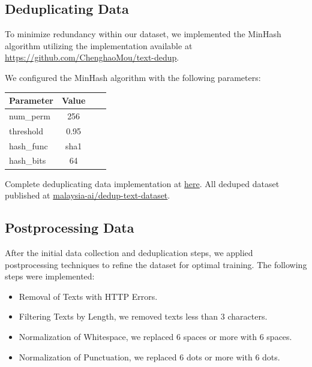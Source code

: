 \documentclass[preprint]{article}
\begin{document}
\subsection{Deduplicating Data}

To minimize redundancy within our dataset, we implemented the MinHash algorithm utilizing the implementation available at \url{https://github.com/ChenghaoMou/text-dedup}.

We configured the MinHash algorithm with the following parameters:

\begin{table}[h]
  \centering
  \begin{tabular}{lccl}
    \hline
    \textbf{Parameter} & \textbf{Value} \\
    \hline
    num\_perm          & 256            \\
    threshold          & 0.95           \\
    hash\_func         & sha1           \\
    hash\_bits         & 64             \\
    \hline
  \end{tabular}
\end{table}

Complete deduplicating data implementation at \href{https://github.com/malaysia-ai/dedup-text-dataset?tab=readme-ov-file#text-dedup}{here}. All deduped dataset published at \href{https://huggingface.co/datasets/malaysia-ai/dedup-text-dataset}{malaysia-ai/dedup-text-dataset}.

\subsection{Postprocessing Data}

After the initial data collection and deduplication steps, we applied postprocessing techniques to refine the dataset for optimal training. The following steps were implemented:

\begin{itemize}
  \item Removal of Texts with HTTP Errors.

  \item Filtering Texts by Length, we removed texts less than 3 characters.

  \item Normalization of Whitespace, we replaced 6 spaces or more with 6 spaces.

  \item Normalization of Punctuation, we replaced 6 dots or more with 6 dots.
\end{itemize}
\end{document}
